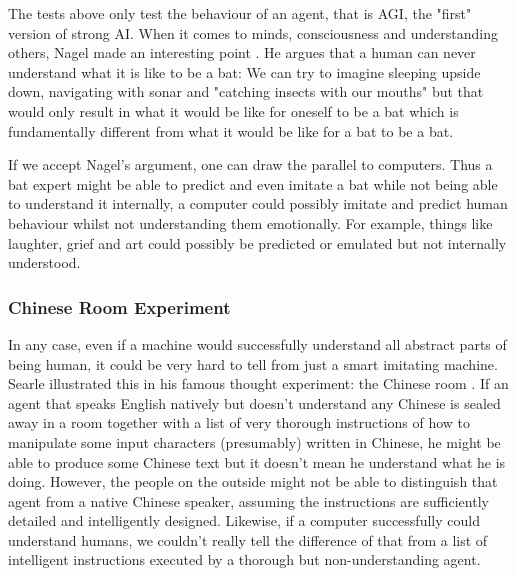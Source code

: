 \documentclass[11pt]{article}
\newenvironment{draft}{\color{dark-cornflower-blue-2}}{\ignorespacesafterend}
\begin{document}
\begin{draft}
The tests above only test the behaviour of an agent, that is AGI, the "first" version of strong AI. When it comes to minds, consciousness and understanding others, Nagel made an interesting point \cite{nagel1974like}. He argues that a human can never understand what it is like to be a bat: We can try to imagine sleeping upside down, navigating with sonar and "catching insects with our mouths" but that would only result in what it would be like for oneself to be a bat which is fundamentally different from what it would be like for a bat to be a bat.


If we accept Nagel's argument, one can draw the parallel to computers. Thus a bat expert might be able to predict and even imitate a bat while not being able to understand it internally, a computer could possibly imitate and predict human behaviour whilst not understanding them emotionally. For example, things like laughter, grief and art could possibly be predicted or emulated but not internally understood.

\subsubsection*{Chinese Room Experiment}
\label{sec:chinese_room}

In any case, even if a machine would successfully understand all abstract parts of being human, it could be very hard to tell from just a smart imitating machine. Searle illustrated this in his famous thought experiment: the Chinese room \cite{searle1980minds} . If an agent that speaks English natively but doesn't understand any Chinese is sealed away in a room together with a list of very thorough instructions of how to manipulate some input characters (presumably) written in Chinese, he might be able to produce some Chinese text but it doesn't mean he understand what he is doing. However, the people on the outside might not be able to distinguish that agent from a native Chinese speaker, assuming the instructions are sufficiently detailed and intelligently designed. Likewise, if a computer successfully could understand humans, we couldn't really tell the difference of that from a list of intelligent instructions executed by a thorough but non-understanding agent.

\end{draft}
\end{document}

